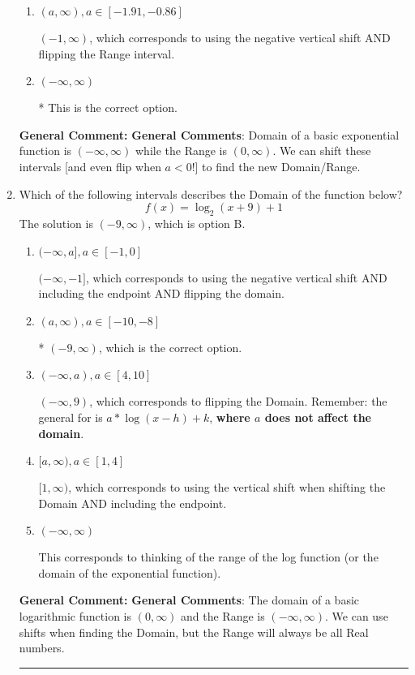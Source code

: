 \documentclass{extbook}[14pt]
\newcommand{\litem}[1]{\item #1

\rule{\textwidth}{0.4pt}}
\begin{document}
\begin{enumerate}
{\begin{enumerate}[label=\Alph*.]
$(-\infty, 1]$, which corresponds to using the correct vertical shift *if we wanted the Range* AND including the endpoint.
\item \( (a, \infty), a \in [-1.91, -0.86] \)

$(-1, \infty)$, which corresponds to using the negative vertical shift AND flipping the Range interval.
\item \( (-\infty, \infty) \)

* This is the correct option.
\end{enumerate}

\textbf{General Comment:} \textbf{General Comments}: Domain of a basic exponential function is $(-\infty, \infty)$ while the Range is $(0, \infty)$. We can shift these intervals [and even flip when $a<0$!] to find the new Domain/Range.
}
\litem{
Which of the following intervals describes the Domain of the function below?
\[ f(x) = \log_2{(x+9)}+1 \]
The solution is \( (-9, \infty) \), which is option B.\begin{enumerate}[label=\Alph*.]
\item \( (-\infty, a], a \in [-1, 0] \)

$(-\infty, -1]$, which corresponds to using the negative vertical shift AND including the endpoint AND flipping the domain.
\item \( (a, \infty), a \in [-10, -8] \)

* $(-9, \infty)$, which is the correct option.
\item \( (-\infty, a), a \in [4, 10] \)

$(-\infty, 9)$, which corresponds to flipping the Domain. Remember: the general for is $a*\log(x-h)+k$, \textbf{where $a$ does not affect the domain}.
\item \( [a, \infty), a \in [1, 4] \)

$[1, \infty)$, which corresponds to using the vertical shift when shifting the Domain AND including the endpoint.
\item \( (-\infty, \infty) \)

This corresponds to thinking of the range of the log function (or the domain of the exponential function).
\end{enumerate}

\textbf{General Comment:} \textbf{General Comments}: The domain of a basic logarithmic function is $(0, \infty)$ and the Range is $(-\infty, \infty)$. We can use shifts when finding the Domain, but the Range will always be all Real numbers.
}
\end{enumerate}
\end{document}
